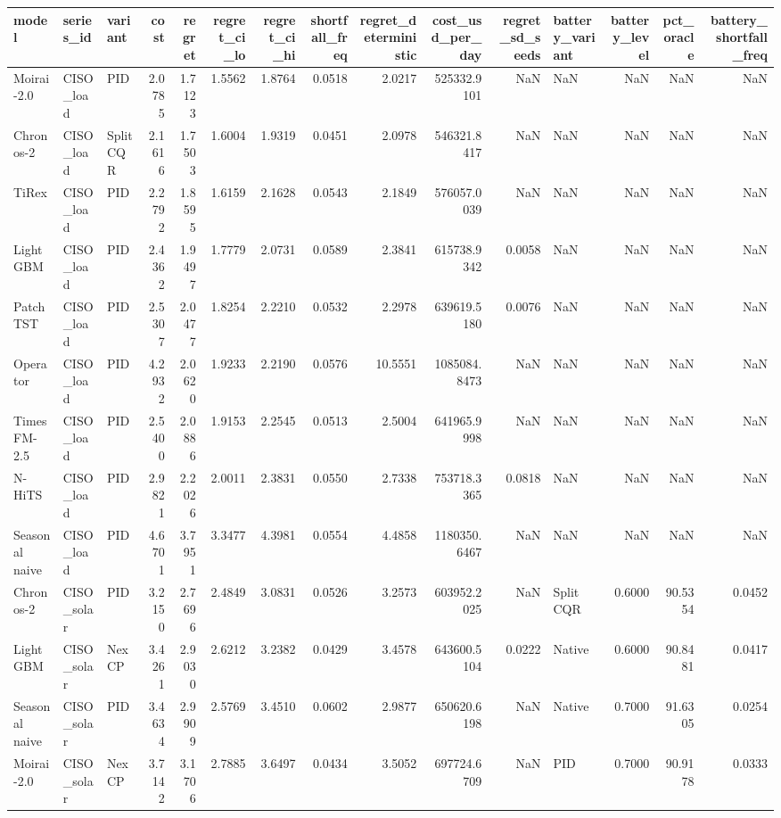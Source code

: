 \begin{tabular}{lllrrrrrrrrlrrr}
\toprule
model & series_id & variant & cost & regret & regret_ci_lo & regret_ci_hi & shortfall_freq & regret_deterministic & cost_usd_per_day & regret_sd_seeds & battery_variant & battery_level & pct_oracle & battery_shortfall_freq \\
\midrule
Moirai-2.0 & CISO_load & PID & 2.0785 & 1.7123 & 1.5562 & 1.8764 & 0.0518 & 2.0217 & 525332.9101 & NaN & NaN & NaN & NaN & NaN \\
Chronos-2 & CISO_load & Split CQR & 2.1616 & 1.7503 & 1.6004 & 1.9319 & 0.0451 & 2.0978 & 546321.8417 & NaN & NaN & NaN & NaN & NaN \\
TiRex & CISO_load & PID & 2.2792 & 1.8595 & 1.6159 & 2.1628 & 0.0543 & 2.1849 & 576057.0039 & NaN & NaN & NaN & NaN & NaN \\
LightGBM & CISO_load & PID & 2.4362 & 1.9497 & 1.7779 & 2.0731 & 0.0589 & 2.3841 & 615738.9342 & 0.0058 & NaN & NaN & NaN & NaN \\
PatchTST & CISO_load & PID & 2.5307 & 2.0477 & 1.8254 & 2.2210 & 0.0532 & 2.2978 & 639619.5180 & 0.0076 & NaN & NaN & NaN & NaN \\
Operator & CISO_load & PID & 4.2932 & 2.0620 & 1.9233 & 2.2190 & 0.0576 & 10.5551 & 1085084.8473 & NaN & NaN & NaN & NaN & NaN \\
TimesFM-2.5 & CISO_load & PID & 2.5400 & 2.0886 & 1.9153 & 2.2545 & 0.0513 & 2.5004 & 641965.9998 & NaN & NaN & NaN & NaN & NaN \\
N-HiTS & CISO_load & PID & 2.9821 & 2.2026 & 2.0011 & 2.3831 & 0.0550 & 2.7338 & 753718.3365 & 0.0818 & NaN & NaN & NaN & NaN \\
Seasonal naive & CISO_load & PID & 4.6701 & 3.7951 & 3.3477 & 4.3981 & 0.0554 & 4.4858 & 1180350.6467 & NaN & NaN & NaN & NaN & NaN \\
Chronos-2 & CISO_solar & PID & 3.2150 & 2.7696 & 2.4849 & 3.0831 & 0.0526 & 3.2573 & 603952.2025 & NaN & Split CQR & 0.6000 & 90.5354 & 0.0452 \\
LightGBM & CISO_solar & NexCP & 3.4261 & 2.9030 & 2.6212 & 3.2382 & 0.0429 & 3.4578 & 643600.5104 & 0.0222 & Native & 0.6000 & 90.8481 & 0.0417 \\
Seasonal naive & CISO_solar & PID & 3.4634 & 2.9909 & 2.5769 & 3.4510 & 0.0602 & 2.9877 & 650620.6198 & NaN & Native & 0.7000 & 91.6305 & 0.0254 \\
Moirai-2.0 & CISO_solar & NexCP & 3.7142 & 3.1706 & 2.7885 & 3.6497 & 0.0434 & 3.5052 & 697724.6709 & NaN & PID & 0.7000 & 90.9178 & 0.0333 \\

\end{tabular}
